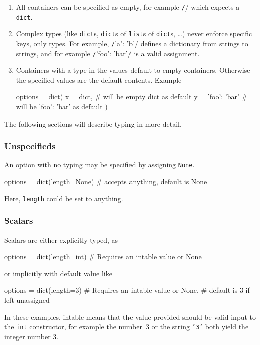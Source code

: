 \begin{enumerate}
\item All containers can be specified as empty, for example
  \texttt/{}/ which expects a \texttt{dict}.

\item Complex types (like \texttt{dict}s, \texttt{dict}s of
  \texttt{list}s of \texttt{dict}s, \dots) never enforce specific
  keys, only types.  For example, \texttt/{'a': 'b'}/
  defines a dictionary from strings to strings, and for example
  \texttt/{'foo': 'bar'}/ is a valid
  assignment.

\item Containers with a type in the values default to empty containers.
  Otherwise the specified values are the default contents.  Example
  \begin{python}
options = dict(
    x = dict,           # will be empty dict as default
    y = {'foo': 'bar'}  # will be {'foo': 'bar'} as default
)
  \end{python}
\end{enumerate}

The following sections will describe typing in more detail.

\subsubsection{Unspecifieds}
An option with no typing may be specified by assigning \texttt{None}.
\begin{python}
options = dict(length=None)  # accepts anything, default is None
\end{python}
Here, \texttt{length} could be set to anything.



\subsubsection*{Scalars}
Scalars are either explicitly typed, as
\begin{python}
options = dict(length=int)   # Requires an intable value or None
\end{python}
or implicitly with default value like
\begin{python}
options = dict(length=3)     # Requires an intable value or None,
                             # default is 3 if left unassigned
\end{python}
In these examples, intable means that the value provided should be
valid input to the \texttt{int} constructor, for example the number~3
or the string \texttt{'3'} both yield the integer number 3.



